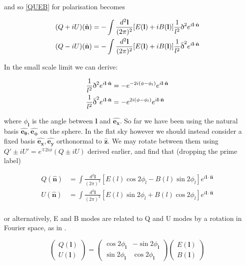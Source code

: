 \documentclass[a4paper,10pt]{article}
\renewcommand{\v}[1]{\mathbf{#1}}
\newcommand{\finttwo}[1]{\int \frac{d^2 \v{#1}}{(2\pi)^2}}
\newcommand{\unit}[1]{\hat{\v{#1}}}
\newcommand{\sr}{\text{\normalfont\dh}}
\renewcommand{\sl}{\bar{\text{\normalfont\dh}}}
\begin{document}
and so \ref{QUEB} for polarisation becomes

\begin{equation}\begin{split}
(Q+iU)(\unit{n}) &= -\finttwo{l} [E(\v{l})+iB(\v{l})]  \frac{1}{l^2}\sr^2e^{i\v{l}\cdot\unit{n}}\\
(Q-iU)(\unit{n}) &= -\finttwo{l} [E(\v{l})+iB(\v{l})] \frac{1}{l^2}\sl^2e^{i\v{l}\cdot\unit{n}}
\end{split}\end{equation}

In the small scale limit we can derive:

\begin{equation}\begin{split}
\frac{1}{l^2}\sr^2e^{i\v{l}\cdot\unit{n}} &= -e^{-2i(\phi-\phi_l)}e^{i\v{l}\cdot\unit{n}}\\
\frac{1}{l^2}\sl^2e^{i\v{l}\cdot\unit{n}} &= -e^{2i(\phi-\phi_l)}e^{i\v{l}\cdot\unit{n}}
\end{split}\end{equation}

where $\phi_\v{l}$ is the angle between $\v{l}$ and $\unit{e_x}$. So far we have been using the natural basis $\unit{e_\theta}, \unit{e_\phi}$ on the sphere. In the flat sky however we should instead consider a fixed basis $\unit{e_x}, \unit{e_y}$ orthonormal to $\unit{z}$. We may rotate between them using $Q'\pm iU' = e^{\mp 2i\phi}(Q\pm iU)$ derived earlier, and find that (dropping the prime label)

\begin{equation}\begin{split}
Q(\unit{n}) &= \finttwo{l} [E(l)\cos{2\phi_l}-B(l)\sin{2\phi_l}]  e^{i\v{l}\cdot\unit{n}}\\
U(\unit{n}) &= \finttwo{l} [E(l)\sin{2\phi_l}+B(l)\cos{2\phi_l}]  e^{i\v{l}\cdot\unit{n}}\\
\end{split}\end{equation}

or alternatively, E and B modes are related to Q and U modes by a rotation in Fourier space, as in \cite{baldauf}. 

\begin{equation}
\begin{pmatrix}
Q(\v{l})\\
U(\v{l}) 
\end{pmatrix}
=
\begin{pmatrix}
\cos{2\phi_\v{l}} & -\sin{2\phi_\v{l}}\\ 
\sin{2\phi_\v{l}} & \cos{2\phi_\v{l}}
\end{pmatrix}
\begin{pmatrix}
E(\v{l})\\
B(\v{l}) 
\end{pmatrix}
\end{equation}
\end{document}

